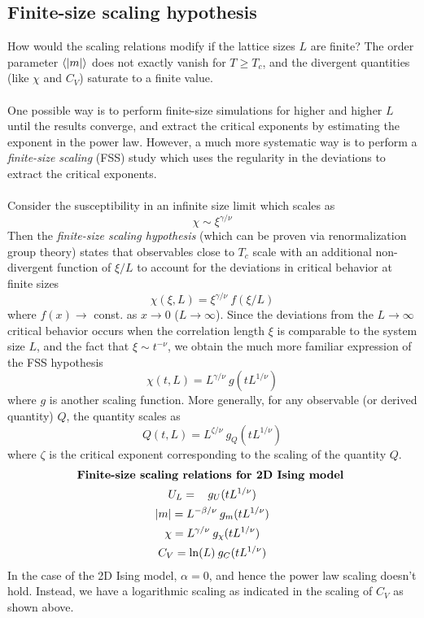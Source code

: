 \documentclass[../thesis_main.tex]{subfiles}
\begin{document}
\subsection{Finite-size scaling hypothesis}
How would the scaling relations modify if the lattice sizes $L$ are finite? The order parameter $\expval{|m|}$ does not exactly vanish for $T \geq T_c$, and the divergent quantities (like $\chi$ and $C_V$) saturate to a finite value.~\\~\\
One possible way is to perform finite-size simulations for higher and higher $L$ until the results converge, and extract the critical exponents by estimating the exponent in the power law. However, a much more systematic way is to perform a \textit{finite-size scaling} (FSS) study which uses the regularity in the deviations to extract the critical exponents.~\\~\\
Consider the susceptibility in an infinite size limit which scales as 
\[
   \chi \sim \xi^{\gamma/\nu}
\]
Then the \textit{finite-size scaling hypothesis} (which can be proven via renormalization group theory) states that observables close to $T_c$ scale with an additional non-divergent function of $\xi/L$ to account for the deviations in critical behavior at finite sizes
\begin{equation}
    \chi(\xi, L) = \xi^{\gamma/\nu} \: f(\xi/L)
\end{equation}
where $f(x) \to $ const. as $x \to 0$ ($L \to \infty$). Since the deviations from the $L \to \infty$ critical behavior occurs when the correlation length $\xi$ is comparable to the system size $L$, and the fact that $\xi \sim t^{-\nu}$, we obtain the much more familiar expression of the FSS hypothesis 
\begin{equation}
    \chi(t, L) = L^{\gamma/\nu} \: g(t L^{1/\nu})
\end{equation}
where $g$ is another scaling function. More generally, for any observable (or derived quantity) $Q$, the quantity scales as
\begin{equation}
    Q(t, L) = L^{\zeta/\nu} \: g_Q(t L^{1/\nu})
\end{equation}
where $\zeta$ is the critical exponent corresponding to the scaling of the quantity $Q$.  
\begin{gather}
    \text{\textbf{Finite-size scaling relations for 2D Ising model} } \\
    U_L =\:\:\: \: g_U(t L^{1/\nu}) \nonumber \\ 
    |m| = L^{-\beta/\nu} \: g_{m}(t L^{1/\nu}) \nonumber \\
    \chi = L^{\gamma/\nu} \: g_\chi(t L^{1/\nu}) \nonumber \\
    C_V = \ln(L) \: g_C(t L^{1/\nu}) \nonumber
\end{gather}
In the case of the 2D Ising model, $\alpha = 0$, and hence the power law scaling doesn't hold. Instead, we have a logarithmic scaling as indicated in the scaling of $C_V$ as shown above.
\end{document}
